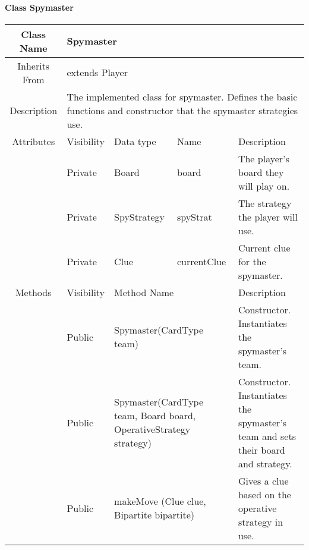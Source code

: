 \paragraph{Class Spymaster}\mbox{}
\begin{tabularx}{\textwidth}{|c||l|l|l|X|}
    \hline
    \cellcolor{lightgray}Class Name & \multicolumn{4}{X|}{Spymaster}\\
    \hline
    \cellcolor{lightgray}Inherits From & \multicolumn{4}{X|}{extends Player}\\
    \hline
    \cellcolor{lightgray}Description & \multicolumn{4}{p{12cm}|}{The implemented class for spymaster. Defines the basic functions and constructor that the spymaster strategies use.}\\
    \hline\hline
    
    \cellcolor{lightgray}Attributes & \cellcolor{lightgray}Visibility & \cellcolor{lightgray}Data type & \cellcolor{lightgray}Name & \cellcolor{lightgray}Description\\\cline{2-5}
    \cellcolor{lightgray} & Private & Board & board & The player's board they will play on.\\\cline{2-5}
    \cellcolor{lightgray} & Private & SpyStrategy & spyStrat & The strategy the player will use.\\\cline{2-5}
    \cellcolor{lightgray} & Private & Clue & currentClue & Current clue for the spymaster.\\
    \hline\hline
    \hline\hline
    
    \cellcolor{lightgray}Methods & \cellcolor{lightgray}Visibility & \multicolumn{2}{l|}{\cellcolor{lightgray}Method Name} & \cellcolor{lightgray}Description\\\cline{2-5}
    \hline
    \cellcolor{lightgray} & Public & \multicolumn{2}{X|}{Spymaster(CardType team)} & Constructor. Instantiates the spymaster's team.\\
    \hline
    \cellcolor{lightgray} & Public & \multicolumn{2}{X|}{Spymaster(CardType team, Board board, OperativeStrategy strategy)} & Constructor. Instantiates the spymaster's team and sets their board and strategy.\\
    \hline
    \cellcolor{lightgray} & Public & \multicolumn{2}{X|}{makeMove (Clue clue, Bipartite bipartite)} & Gives a clue based on the operative strategy in use.\\
    \hline
\end{tabularx}